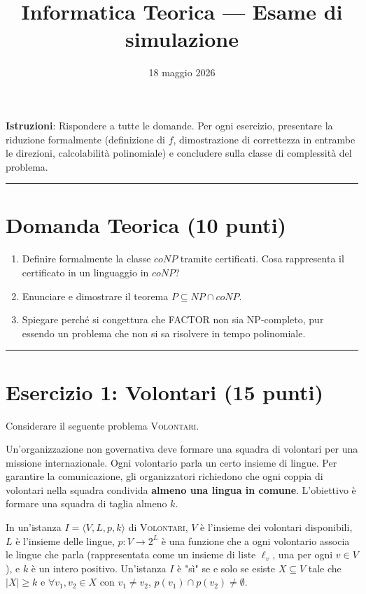 \documentclass{report}
\title{Informatica Teorica --- Esame di simulazione}
\author{}
\date{18 maggio 2026}
\begin{document}
\maketitle

\vspace{1cm}

\textbf{Istruzioni}: Rispondere a tutte le domande. Per ogni esercizio, presentare la riduzione formalmente (definizione di $f$, dimostrazione di correttezza in entrambe le direzioni, calcolabilità polinomiale) e concludere sulla classe di complessità del problema.

\vspace{1cm}

\hrule

\section*{Domanda Teorica (10 punti)}

\begin{enumerate}
  \item[(a)] Definire formalmente la classe $coNP$ tramite certificati. Cosa rappresenta il certificato in un linguaggio in $coNP$?
  \item[(b)] Enunciare e dimostrare il teorema $P \subseteq NP \cap coNP$.
  \item[(c)] Spiegare perché si congettura che FACTOR non sia NP-completo, pur essendo un problema che non si sa risolvere in tempo polinomiale.
\end{enumerate}

\hrule

\section*{Esercizio 1: Volontari (15 punti)}

Considerare il seguente problema \textsc{Volontari}.

Un'organizzazione non governativa deve formare una squadra di volontari per una missione internazionale. Ogni volontario parla un certo insieme di lingue. Per garantire la comunicazione, gli organizzatori richiedono che ogni coppia di volontari nella squadra condivida \textbf{almeno una lingua in comune}. L'obiettivo è formare una squadra di taglia almeno $k$.

In un'istanza $I = \langle V, L, p, k\rangle$ di \textsc{Volontari}, $V$ è l'insieme dei volontari disponibili, $L$ è l'insieme delle lingue, $p : V \to 2^L$ è una funzione che a ogni volontario associa le lingue che parla (rappresentata come un insieme di liste $\ell_v$, una per ogni $v \in V$), e $k$ è un intero positivo. Un'istanza $I$ è "sì" se e solo se esiste $X \subseteq V$ tale che $|X| \geq k$ e $\forall v_1, v_2 \in X$ con $v_1 \neq v_2$, $p(v_1) \cap p(v_2) \neq \emptyset$.
\end{document}
